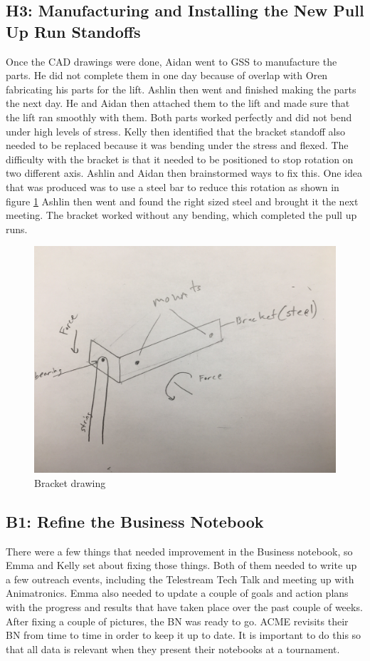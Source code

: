 \documentclass{article}
\begin{document}
\subsection{H3: Manufacturing and Installing the New Pull Up Run Standoffs}

Once the CAD drawings were done, Aidan went to GSS to manufacture the parts. He did not complete them in one day because of overlap with Oren fabricating his parts for the lift. Ashlin then went and finished making the parts the next day. He and Aidan then attached them to the lift and made sure that the lift ran smoothly with them. Both parts worked perfectly and did not bend under high levels of stress. Kelly then identified that the bracket standoff also needed to be replaced because it was bending under the stress and flexed. The difficulty with the bracket is that it needed to be positioned to stop rotation on two different axis. Ashlin and Aidan then brainstormed ways to fix this. One idea that was produced was to use a steel bar to reduce this rotation as shown in figure \ref{fig: bracket} Ashlin then went and found the right sized steel and brought it the next meeting. The bracket worked without any bending, which completed the pull up runs.

\begin{figure}
    \centering
    \includegraphics[width= 0.5 \textwidth]{26_02-25/images/Bracket.jpg}
    \caption{Bracket drawing}
    \label{fig: bracket}
\end{figure}
\subsection{B1: Refine the Business Notebook}

There were a few things that needed improvement in the Business notebook, so Emma and Kelly set about fixing those things. Both of them needed to write up a few outreach events, including the Telestream Tech Talk and meeting up with Animatronics. Emma also needed to update a couple of goals and action plans with the progress and results that have taken place over the past couple of weeks. After fixing a couple of pictures, the BN was ready to go. ACME revisits their BN from time to time in order to keep it up to date. It is important to do this so that all data is relevant when they present their notebooks at a tournament. 
\end{document}
